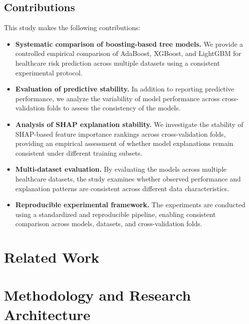 \documentclass[12pt]{ai_conquer2026}
\begin{document}
\subsection{Contributions}

This study makes the following contributions:

\begin{itemize}
    \item \textbf{Systematic comparison of boosting-based tree models.}
    We provide a controlled empirical comparison of AdaBoost, XGBoost, and
    LightGBM for healthcare risk prediction across multiple datasets using a
    consistent experimental protocol.

    \item \textbf{Evaluation of predictive stability.}
    In addition to reporting predictive performance, we analyze the variability
    of model performance across cross-validation folds to assess the
    consistency of the models.

    \item \textbf{Analysis of SHAP explanation stability.}
    We investigate the stability of SHAP-based feature importance rankings
    across cross-validation folds, providing an empirical assessment of
    whether model explanations remain consistent under different training
    subsets.

    \item \textbf{Multi-dataset evaluation.}
    By evaluating the models across multiple healthcare datasets, the study
    examines whether observed performance and explanation patterns are
    consistent across different data characteristics.

    \item \textbf{Reproducible experimental framework.}
    The experiments are conducted using a standardized and reproducible
    pipeline, enabling consistent comparison across models, datasets, and
    cross-validation folds.
\end{itemize}

\section{Related Work}
\label{sec:related_work}



\section{Methodology and Research Architecture}
\label{sec:methodology}

\end{document}

